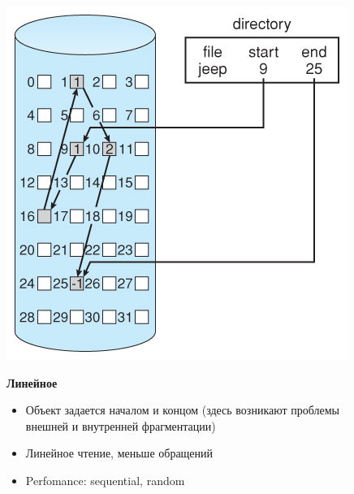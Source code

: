 \documentclass[../../lectures.tex]{subfiles}
\begin{document}
\begin{figure}[H]
\captionsetup{singlelinecheck=off}
\begin{minipage}[c]{0.5\linewidth}
\centering
\includegraphics[width=\textwidth]{images/linked-allocation.jpg}
\end{minipage}
\hspace{0.5cm}
\begin{minipage}[c]{0.5\linewidth}
\centering
\textbf{Линейное}
\begin{itemize}
    \item Объект задается началом и концом (здесь возникают проблемы внешней и внутренней фрагментации)
    \item Линейное чтение, меньше обращений
    \item Perfomance: sequential, random
\end{itemize}
\end{minipage}
\end{figure}
\end{document}
